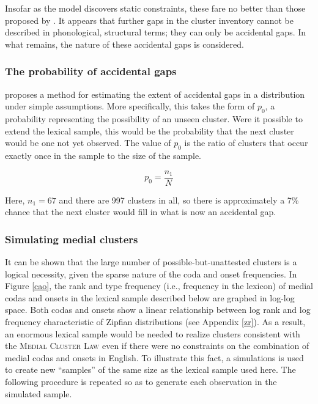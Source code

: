 Insofar as the \citet{Hayes2008a} model discovers static constraints, these fare no better than those proposed by \citet{Pierrehumbert1994}.
It appears that further gaps in the cluster inventory cannot be described in phonological, structural terms; they can only be accidental gaps.
In what remains, the nature of these accidental gaps is considered.

\subsubsection{The probability of accidental gaps}

\citet{Good1953} proposes a method for estimating the extent of accidental gaps in a distribution under simple assumptions. More specifically, this takes the form of $p_0$, a probability representing the possibility of an unseen cluster. Were it possible to extend the lexical sample, this would be the probability that the next cluster would be one not yet observed.
The value of $p_0$ is the ratio of clusters that occur exactly once in the sample to the size of the sample.

\begin{equation*}
\displaystyle p_0 = \frac{n_1}{N}
\end{equation*}

\noindent
Here, $n_1 = 67$ and there are 997 clusters in all, so there is approximately a 7\% chance that the next cluster would fill in what is now an accidental gap.

\subsubsection{Simulating medial clusters}
\label{simulate}

It can be shown that the large number of possible-but-unattested clusters is a logical necessity, given the sparse nature of the coda and onset frequencies. 
In Figure \ref{cao}, the rank and type frequency (i.e., frequency in the lexicon) of medial codas and onsets in the lexical sample described below are graphed in log-log space. 
Both codas and onsets show a linear relationship between log rank and log frequency characteristic of Zipfian distributions (see Appendix \ref{zr}). 
As a result, an enormous lexical sample would be needed to realize clusters consistent with the \textsc{Medial Cluster Law} even if there were no constraints on the combination of medial codas and onsets in English.
To illustrate this fact, a simulations is used to create new ``samples'' of the same size as the lexical sample used here. The following procedure is repeated so as to generate each observation in the simulated sample.

